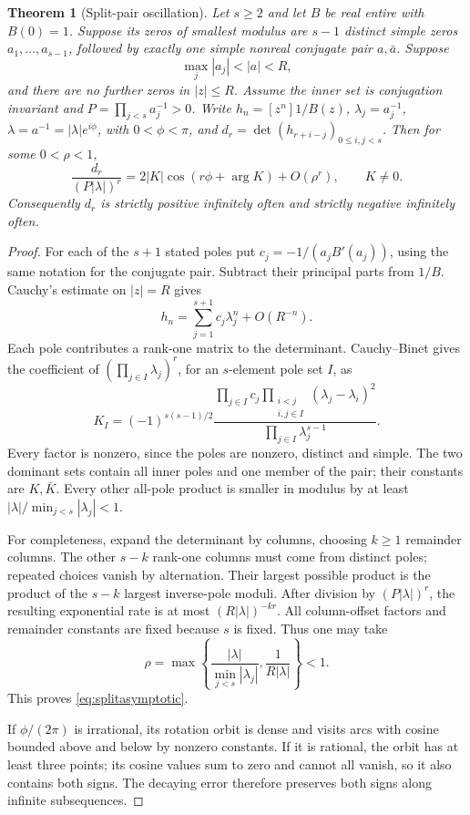 \documentclass[11pt]{article}
\newtheorem{theorem}{Theorem}[section]
\theoremstyle{remark}
\begin{document}
\begin{theorem}[Split-pair oscillation]\label{thm:splitpair}
Let \(s\ge2\) and let \(B\) be real entire with \(B(0)=1\).
Suppose its zeros of smallest
modulus are \(s-1\) distinct simple zeros
\(a_1,\ldots,a_{s-1}\), followed by exactly one simple nonreal conjugate
pair \(a,\bar a\). Suppose
\[
 \max_j|a_j|<|a|<R,
\]
and there are no further zeros in \(|z|\le R\).
Assume the inner set is conjugation invariant and
\(P=\prod_{j<s}a_j^{-1}>0\).
Write \(h_n=[z^n]1/B(z)\), \(\lambda_j=a_j^{-1}\),
\(\lambda=a^{-1}=|\lambda|e^{i\phi}\), with \(0<\phi<\pi\),
and \(d_r=\det(h_{r+i-j})_{0\le i,j<s}\).
Then for some \(0<\rho<1\),
\begin{equation}\label{eq:splitasymptotic}
 \frac{d_r}{(P|\lambda|)^r}
 =2|K|\cos(r\phi+\arg K)+O(\rho^r),
 \qquad K\ne0.
\end{equation}
Consequently \(d_r\) is strictly positive infinitely often and strictly
negative infinitely often.
\end{theorem}
\begin{proof}
For each of the \(s+1\) stated poles put
\(c_j=-1/(a_jB'(a_j))\), using the same notation for the conjugate pair.
Subtract their principal parts from \(1/B\). Cauchy's estimate on
\(|z|=R\) gives
\[
 h_n=\sum_{j=1}^{s+1}c_j\lambda_j^n+O(R^{-n}).
\]
Each pole contributes a rank-one matrix to the determinant.
Cauchy--Binet gives the coefficient of
\((\prod_{j\in I}\lambda_j)^r\), for an \(s\)-element pole set \(I\), as
\begin{equation}\label{eq:splitconstant}
 K_I=(-1)^{s(s-1)/2}
 \frac{\displaystyle\prod_{j\in I}c_j
       \displaystyle\prod_{\substack{i<j\\i,j\in I}}(\lambda_j-\lambda_i)^2}
      {\displaystyle\prod_{j\in I}\lambda_j^{s-1}}.
\end{equation}
Every factor is nonzero, since the poles are nonzero, distinct and simple.
The two dominant sets contain all inner poles and one member of the pair;
their constants are \(K,\bar K\).
Every other all-pole product is smaller in modulus by at least
\(|\lambda|/\min_{j<s}|\lambda_j|<1\).

For completeness, expand the determinant by columns, choosing \(k\ge1\)
remainder columns. The other \(s-k\) rank-one columns must come from
distinct poles; repeated choices vanish by alternation.
Their largest possible product is the product of the \(s-k\) largest
inverse-pole moduli. After division by \((P|\lambda|)^r\), the resulting
exponential rate is at most \((R|\lambda|)^{-kr}\).
All column-offset factors and remainder constants are fixed because \(s\)
is fixed. Thus one may take
\[
 \rho=\max\left\{\frac{|\lambda|}{\min_{j<s}|\lambda_j|},
                  \frac1{R|\lambda|}\right\}<1.
\]
This proves \eqref{eq:splitasymptotic}.

If \(\phi/(2\pi)\) is irrational, its rotation orbit is dense and visits
arcs with cosine bounded above and below by nonzero constants.
If it is rational, the orbit has at least three points; its cosine
values sum to zero and cannot all vanish, so it also contains both signs.
The decaying error therefore preserves both signs along infinite
subsequences.
\end{proof}
\end{document}
